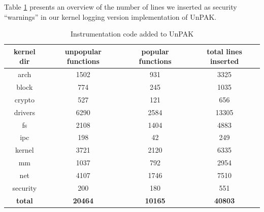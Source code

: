 Table \ref{tab:kernel_instrumentation} presents an overview of the number of lines we inserted as security ``warnings'' in our kernel logging version implementation of UnPAK.  

\begin{table}[h!]
\begin{center}
\caption{Instrumentation code added to UnPAK}
\label{tab:kernel_instrumentation}
\begin{tabular}{c|c|c|c}
 kernel dir & unpopular functions & popular functions & total lines inserted \\
 \hline
 arch & 1502 & 931 & 3325 \\
 \hline
 block & 774 & 245 & 1035 \\
 \hline
 crypto & 527 & 121 & 656 \\ 
 \hline
 drivers & 6290 & 2584 & 13305 \\
 \hline
 fs & 2108 & 1404 & 4883 \\
 \hline
 ipc & 198 & 42 & 249 \\
 \hline
 kernel & 3721 & 2120 & 6335 \\
 \hline
 mm & 1037 & 792 & 2954 \\
 \hline
 net & 4107 & 1746 & 7510 \\
 \hline
 security & 200 & 180 & 551 \\
 \hline
 \textbf{total} & \textbf{20464} & \textbf{10165} & \textbf{40803} \\
\end{tabular}
\end{center}
\end{table}